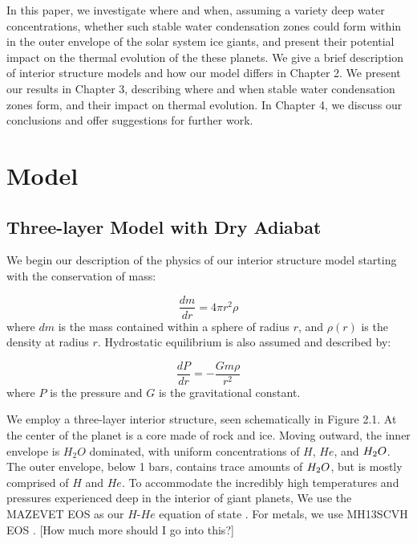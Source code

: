 \documentclass[11pt]{ucscthesisbs}
\begin{document}
In this paper, we investigate where and when, assuming a variety deep water concentrations, whether such stable water condensation zones could form within in the outer envelope of the solar system ice giants, and present their potential impact on the thermal evolution of the these planets. We give a brief description of interior structure models and how our model differs in Chapter 2. We present our results in Chapter 3, describing where and when stable water condensation zones form, and their impact on thermal evolution. In Chapter 4, we discuss our conclusions and offer suggestions for further work.


\chapter{Model}

\section{Three-layer Model with Dry Adiabat}
\label{Three-layer Model with Dry Adiabat}
We begin our description of the physics of our interior structure model starting with the conservation of mass:

\begin{equation}
  \frac{dm}{dr} =4 \pi r^{2}\rho  
\end{equation}
where $dm$ is the mass contained within a sphere of radius $r$, and $\rho(r)$ is the density at radius $r$. Hydrostatic equilibrium is also assumed and described by:

\begin{equation}
  \frac{dP}{dr} = -\frac{Gm\rho}{r^{2}}  
\end{equation}
where $P$ is the pressure and $G$ is the gravitational constant. 

We employ a three-layer interior structure, seen schematically in Figure 2.1. At the center of the planet is a core made of rock and ice. Moving outward, the inner envelope is $H_{2}O$ dominated, with uniform concentrations of $H$, $He$, and $H_{\rm{2}}O$. The outer envelope, below 1 bars, contains trace amounts of $H_{\rm{2}}O$, but is mostly comprised of $H$ and $He$. To accommodate the incredibly high temperatures and pressures experienced deep in the interior of giant planets, We use the MAZEVET EOS as our $H$-$He$ equation of state \citep{mazevet_2019}. For metals, we use MH13SCVH EOS \citep{miguel_2018}. [How much more should I go into this?]
\end{document}
